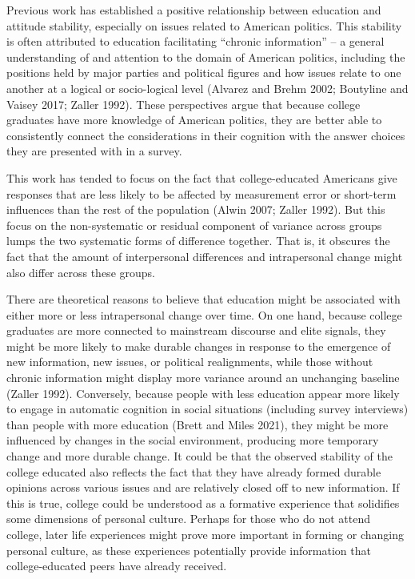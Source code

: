 \documentclass[
  11pt,
]{article}
\begin{document}
Previous work has established a positive relationship between education
and attitude stability, especially on issues related to American
politics. This stability is often attributed to education facilitating
``chronic information'' -- a general understanding of and attention to
the domain of American politics, including the positions held by major
parties and political figures and how issues relate to one another at a
logical or socio-logical level (Alvarez and Brehm 2002; Boutyline and
Vaisey 2017; Zaller 1992). These perspectives argue that because college
graduates have more knowledge of American politics, they are better able
to consistently connect the considerations in their cognition with the
answer choices they are presented with in a survey.

This work has tended to focus on the fact that college-educated
Americans give responses that are less likely to be affected by
measurement error or short-term influences than the rest of the
population (Alwin 2007; Zaller 1992). But this focus on the
non-systematic or residual component of variance across groups lumps the
two systematic forms of difference together. That is, it obscures the
fact that the amount of interpersonal differences and intrapersonal
change might also differ across these groups.

There are theoretical reasons to believe that education might be
associated with either more or less intrapersonal change over time. On
one hand, because college graduates are more connected to mainstream
discourse and elite signals, they might be more likely to make durable
changes in response to the emergence of new information, new issues, or
political realignments, while those without chronic information might
display more variance around an unchanging baseline (Zaller 1992).
Conversely, because people with less education appear more likely to
engage in automatic cognition in social situations (including survey
interviews) than people with more education (Brett and Miles 2021), they
might be more influenced by changes in the social environment, producing
more temporary change and more durable change. It could be that the
observed stability of the college educated also reflects the fact that
they have already formed durable opinions across various issues and are
relatively closed off to new information. If this is true, college could
be understood as a formative experience that solidifies some dimensions
of personal culture. Perhaps for those who do not attend college, later
life experiences might prove more important in forming or changing
personal culture, as these experiences potentially provide information
that college-educated peers have already received.
\end{document}

